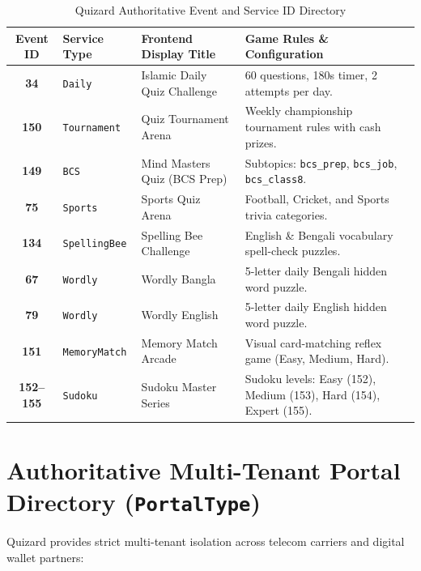 \documentclass[11pt,a4paper,oneside]{report}
\begin{document}
\begin{table}[htbp]
\centering
\footnotesize
\begin{tabular}{|c|l|l|p{6.4cm}|}
\hline
\rowcolor{primaryBlue!15}
\textbf{Event ID} & \textbf{Service Type} & \textbf{Frontend Display Title} & \textbf{Game Rules \& Configuration} \\ \hline
\textbf{34} & \texttt{Daily} & Islamic Daily Quiz Challenge & 60 questions, 180s timer, 2 attempts per day. \\ \hline
\textbf{150} & \texttt{Tournament} & Quiz Tournament Arena & Weekly championship tournament rules with cash prizes. \\ \hline
\textbf{149} & \texttt{BCS} & Mind Masters Quiz (BCS Prep) & Subtopics: \texttt{bcs\_prep}, \texttt{bcs\_job}, \texttt{bcs\_class8}. \\ \hline
\textbf{75} & \texttt{Sports} & Sports Quiz Arena & Football, Cricket, and Sports trivia categories. \\ \hline
\textbf{134} & \texttt{SpellingBee} & Spelling Bee Challenge & English \& Bengali vocabulary spell-check puzzles. \\ \hline
\textbf{67} & \texttt{Wordly} & Wordly Bangla & 5-letter daily Bengali hidden word puzzle. \\ \hline
\textbf{79} & \texttt{Wordly} & Wordly English & 5-letter daily English hidden word puzzle. \\ \hline
\textbf{151} & \texttt{MemoryMatch} & Memory Match Arcade & Visual card-matching reflex game (Easy, Medium, Hard). \\ \hline
\textbf{152--155} & \texttt{Sudoku} & Sudoku Master Series & Sudoku levels: Easy (152), Medium (153), Hard (154), Expert (155). \\ \hline
\end{tabular}
\caption{Quizard Authoritative Event and Service ID Directory}
\end{table}

\section{Authoritative Multi-Tenant Portal Directory (\texttt{PortalType})}
Quizard provides strict multi-tenant isolation across telecom carriers and digital wallet partners:
\end{document}
